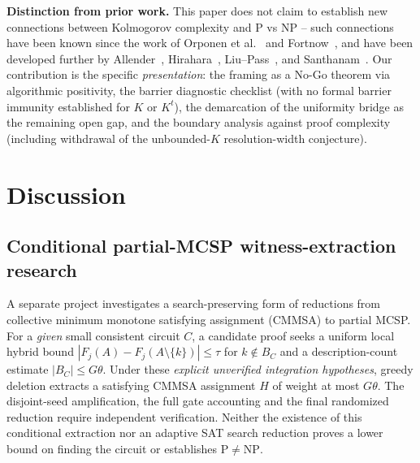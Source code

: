 \documentclass[aps,prd,twocolumn,superscriptaddress,nofootinbib]{revtex4-2}
\theoremstyle{definition}
\theoremstyle{remark}
\newcommand{\NP}{\mathrm{NP}}
\newcommand{\PP}{\mathrm{P}}
\begin{document}
\textbf{Distinction from prior work.}
This paper does not claim to establish new connections between Kolmogorov complexity and $\PP$ vs $\NP$ -- such connections have been known since the work of Orponen et al.~\cite{OrponenKoSchoeningWatanabe1994} and Fortnow~\cite{Fortnow2000}, and have been developed further by Allender~\cite{Allender2001,Allender2006}, Hirahara~\cite{Hirahara2018}, Liu--Pass~\cite{LiuPass2020}, and Santhanam~\cite{Santhanam2023}. Our contribution is the specific \emph{presentation}: the framing as a No-Go theorem via algorithmic positivity, the barrier diagnostic checklist (with no formal barrier immunity established for $K$ or $K^t$), the demarcation of the uniformity bridge as the remaining open gap, and the boundary analysis against proof complexity (including withdrawal of the unbounded-$K$ resolution-width conjecture).

\section{Discussion}
\label{sec:discussion}

\subsection{Conditional partial-MCSP witness-extraction research}
\label{sec:partial-mcsp-transfer}
A separate project investigates a search-preserving form of reductions
from collective minimum monotone satisfying assignment (CMMSA)
to partial MCSP. For a \emph{given} small consistent circuit $C$, a
candidate proof seeks a uniform local hybrid bound
$|F_j(A)-F_j(A\setminus\{k\})|\le\tau$ for $k\notin B_C$ and a
description-count estimate $|B_C|\le G\theta$. Under these
\emph{explicit unverified integration hypotheses}, greedy deletion
extracts a satisfying CMMSA assignment $H$ of weight at most
$G\theta$. The disjoint-seed amplification, the full gate accounting
and the final randomized reduction require independent verification.
Neither the existence of this conditional extraction nor an adaptive
SAT search reduction proves a lower bound on finding the circuit
or establishes $\PP\ne\NP$.
\end{document}
